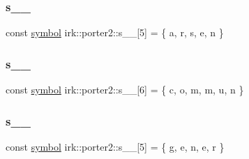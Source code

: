 \subsubsection{\texorpdfstring{s\+\_\+\_}{s\_0\_0}}
{\footnotesize\ttfamily const \mbox{\hyperlink{namespaceirk_1_1porter2_afd04c4eb58a1dabcf8f3ab2d7e9f9ed5}{symbol}} irk\+::porter2\+::s\+\_\+\_\mbox{[}5\mbox{]} = \{ \textquotesingle{}a\textquotesingle{}, \textquotesingle{}r\textquotesingle{}, \textquotesingle{}s\textquotesingle{}, \textquotesingle{}e\textquotesingle{}, \textquotesingle{}n\textquotesingle{} \}\hspace{0.3cm}{\ttfamily [static]}}

\mbox{\label{namespaceirk_1_1porter2_a500fbb6a1584ec25e84ced156ea683a4}} 
\subsubsection{\texorpdfstring{s\+\_\+\_}{s\_0\_1}}
{\footnotesize\ttfamily const \mbox{\hyperlink{namespaceirk_1_1porter2_afd04c4eb58a1dabcf8f3ab2d7e9f9ed5}{symbol}} irk\+::porter2\+::s\+\_\+\_\mbox{[}6\mbox{]} = \{ \textquotesingle{}c\textquotesingle{}, \textquotesingle{}o\textquotesingle{}, \textquotesingle{}m\textquotesingle{}, \textquotesingle{}m\textquotesingle{}, \textquotesingle{}u\textquotesingle{}, \textquotesingle{}n\textquotesingle{} \}\hspace{0.3cm}{\ttfamily [static]}}

\mbox{\label{namespaceirk_1_1porter2_a9cdc597d2cc6f5daa6d20e9e9ac982ee}} 
\subsubsection{\texorpdfstring{s\+\_\+\_}{s\_0\_2}}
{\footnotesize\ttfamily const \mbox{\hyperlink{namespaceirk_1_1porter2_afd04c4eb58a1dabcf8f3ab2d7e9f9ed5}{symbol}} irk\+::porter2\+::s\+\_\+\_\mbox{[}5\mbox{]} = \{ \textquotesingle{}g\textquotesingle{}, \textquotesingle{}e\textquotesingle{}, \textquotesingle{}n\textquotesingle{}, \textquotesingle{}e\textquotesingle{}, \textquotesingle{}r\textquotesingle{} \}\hspace{0.3cm}{\ttfamily [static]}}

